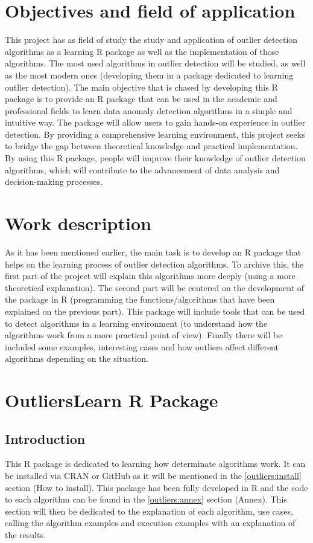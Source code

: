 \documentclass{article}
\begin{document}
\section{Objectives and field of application}
This project has as field of study the study and application of outlier detection algorithms as a learning R package as well as the implementation of those algorithms. The most used algorithms in outlier detection will be studied, as well as the most modern ones (developing them in a package dedicated to learning outlier detection).
The main objective that is chased by developing this R package is to provide an R package that can be used in the academic and professional fields to learn data anomaly detection algorithms in a simple and intuitive way.
The package will allow users to gain hands-on experience in outlier detection. By providing a comprehensive learning environment, this project seeks to bridge the gap between theoretical knowledge and practical implementation. By using this R package, people will improve their knowledge of outlier detection algorithms, which will contribute to the advancement of data analysis and decision-making processes.

\section{Work description}
As it has been mentioned earlier, the main task is to develop an R package that helps on the learning process of outlier detection algorithms. To archive this, the first part of the project will explain this algorithms more deeply (using a more theoretical explanation).
The second part will be centered on the development of the package in R (programming the functions/algorithms that have been explained on the previous part). This package will include tools that can be used to detect algorithms in a learning environment (to understand how the algorithms work from a more practical point of view).
Finally there will be included some examples, interesting cases and how outliers affect different algorithms depending on the situation.

\section{OutliersLearn R Package}
\subsection{Introduction}
This R package is dedicated to learning how determinate algorithms work. It can be installed via CRAN or GitHub as it will be mentioned in the \ref{outliers:install} section (How to install). This package has been fully developed in R and the code to each algorithm can be found in the \ref{outliers:annex} section (Annex). This section will then be dedicated to the explanation of each algorithm, use cases, calling the algorithm examples and execution examples with an explanation of the results.
\end{document}
